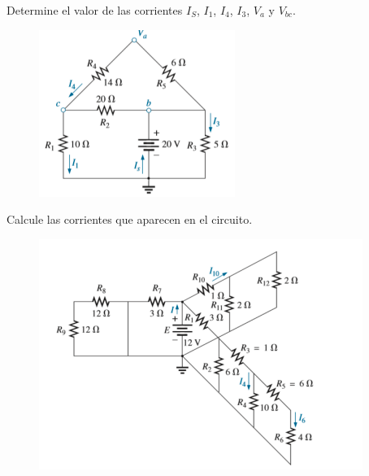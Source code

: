 \begin{mdframed}[style=warning]
	\begin{ejercicio}
		Determine el valor de las corrientes $I_S$, $I_1$, $I_4$, $I_3$, $V_a$ y $V_{bc}$.
		\begin{figure}[H]
			\centering
			\includegraphics[scale=0.65]{./img/p1.png}
		\end{figure}
	\end{ejercicio}
\end{mdframed}






\begin{mdframed}[style=warning]
	\begin{ejercicio}
		Calcule las corrientes que aparecen en el circuito.
		\begin{figure}[H]
			\centering
			\includegraphics[scale=0.65]{./img/p2.png}
		\end{figure}
	\end{ejercicio}
\end{mdframed}
















